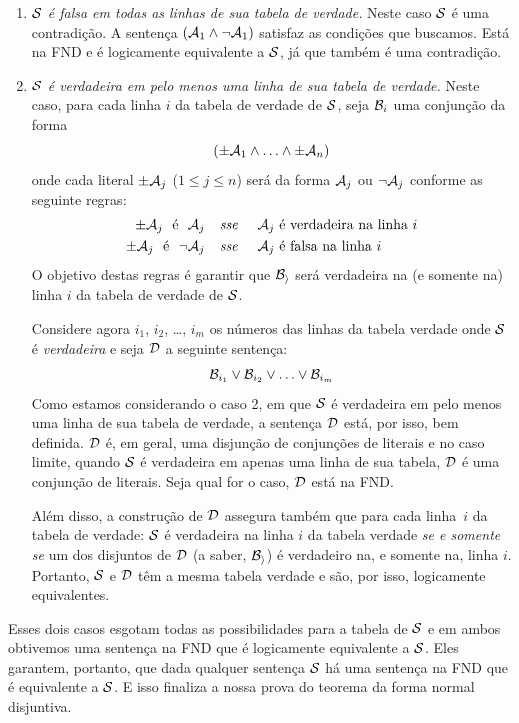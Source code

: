 	\begin{enumerate}
		\item \emph{$\mathcal{S}$ é falsa em todas as linhas de sua tabela de verdade.} Neste caso  $\mathcal{S}$ é uma contradição.
		A sentença $(\mathcal{A}_1 \wedge \neg \mathcal{A}_1)$ satisfaz as condições que buscamos.
		Está na FND e é logicamente equivalente a $\mathcal{S}$, já que também é uma contradição.
	
		\item\emph{$\mathcal{S}$ é verdadeira em pelo menos uma linha de sua tabela de verdade.}
		Neste caso, para cada linha $i$ da tabela de verdade de $\mathcal{S}$, seja $\mathcal{B}_i$ uma conjunção da forma
		$$(\pm\mathcal{A}_{1} \land \ldots \land \pm\mathcal{A}_{n})$$
			onde cada literal $\pm\mathcal{A}_{j}$ ($1 \leq j \leq n$) será da forma $\mathcal{A}_{j}$ ou $\neg\mathcal{A}_{j}$ conforme as seguinte regras:
			\begin{align*}
				\pm\meta{A}_{j}\text{ \ é \ }\meta{A}_{j}&\emph{ \ \ sse \ \ \ }\meta{A}_{j}\text{ é verdadeira na linha }i\\
				\pm\meta{A}_{j}\text{ \ é \ }\enot\meta{A}_{j}&\emph{ \ \ sse \ \ \ }\meta{A}_{j}\text{ é falsa na linha }i
			\end{align*}
		O objetivo destas regras é garantir que  $\mathcal{B_i}$ será verdadeira na (e somente na) linha $i$ da tabela de verdade de $\mathcal{S}$.
		
		Considere agora  $i_1$, $i_2$, \dots, $i_m$ os números das linhas da tabela verdade onde $\mathcal{S}$ é \emph{verdadeira} e seja $\mathcal{D}$ a seguinte sentença:
		$$\mathcal{B}_{i_1} \vee \mathcal{B}_{i_2} \vee \ldots \vee \mathcal{B}_{i_m}$$
		Como estamos considerando o caso 2, em que $\mathcal{S}$ é verdadeira em pelo menos uma linha de sua tabela de verdade, a sentença $\mathcal{D}$ está, por isso, bem definida.
		$\mathcal{D}$ é, em geral, uma disjunção de conjunções de literais e no caso limite, quando $\mathcal{S}$ é verdadeira em apenas uma linha de sua tabela, $\mathcal{D}$ é uma conjunção de literais.
		Seja qual for o caso, $\mathcal{D}$ está na FND.
		
		Além disso, a construção de $\mathcal{D}$ assegura também que para cada linha~$i$ da tabela de verdade:
		$\mathcal{S}$ é verdadeira na linha $i$ da tabela verdade \emph{se e somente se} um dos disjuntos de $\mathcal{D}$ (a saber, $\mathcal{B_i}$) é verdadeiro na, e somente na, linha $i$.
		Portanto, $\mathcal{S}$ e $\mathcal{D}$ têm a mesma tabela verdade e são, por isso, logicamente equivalentes.
	\end{enumerate}
	Esses dois casos esgotam todas as possibilidades para a tabela de $\mathcal{S}$ e em ambos obtivemos uma sentença na FND que é logicamente equivalente a $\mathcal{S}$.
	Eles garantem, portanto, que dada qualquer sentença $\mathcal{S}$ há uma sentença na FND que é equivalente a $\mathcal{S}$. E isso finaliza a nossa prova do teorema da forma normal disjuntiva.

